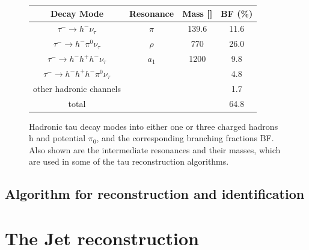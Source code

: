 \begin{figure}[tbh!]
	\begin{center}	
			\begin{tabular}{ | c | c | c | c |}
				\hline
				Decay Mode & Resonance & Mass [\mev] & BF (\%) \\ \hline
				\hline
				$\tau^{-}\longrightarrow h^{-}\nu_{\tau}$& $\pi$ & 139.6 & 11.6 \\ \hline
				$\tau^{-}\longrightarrow h^{-}\pi^{0}\nu_{\tau}$& $\rho$ & 770 & 26.0 \\ \hline
				$\tau^{-}\longrightarrow h^{-} h^{+} h^{-} \nu_{\tau}$& $a_{1}$& 1200 & 9.8 \\ \hline
				$\tau^{-}\longrightarrow h^{-} h^{+} h^{-} \pi^{0}\nu_{\tau}$& & & 4.8 \\ \hline
				other hadronic channels& & & 1.7 \\ \hline
				\hline
				total & & & 64.8 \\ \hline
				\hline
			\end{tabular}
		\caption{ Hadronic tau decay modes into either one or three charged hadrons h and potential $\pi_{0}$, and the corresponding branching fractions BF. Also shown are the intermediate resonances and their masses, which are used in some of the tau reconstruction algorithms.}
		\label{table:tau_hdecay}
	\end{center}
\end{figure}

\subsection{Algorithm for \hadtau reconstruction and identiﬁcation}



\clearpage
\section {The Jet reconstruction}

